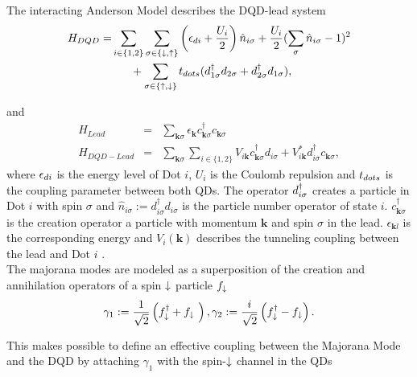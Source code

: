 \documentclass[showpacs,aps,prb,reprint,superscriptaddress]{revtex4-1}
\begin{document}
The interacting Anderson Model describes the DQD-lead system  
\begin{align}
\begin{split}
    H_{DQD}=&  \sum_{i\in\{1,2\}} \sum_{\sigma\in \{ \downarrow , \uparrow\}}  \left(\epsilon_{di}+\frac{U_i}{2}\right)\hat{n}_{i\sigma}+ \frac{U_i}{2}(\sum_{\sigma} \hat{n}_{i\sigma}-1)^{2} \\ 
&\ \ \ \ \ + \sum_{\sigma \in \{\uparrow , \downarrow\}} t_{dots}(d^{\dagger}_{1\sigma}  d_{2\sigma}+d^{\dagger}_{2\sigma}  d_{1\sigma}), \label{eq:H_DQD}
\end{split}
\end{align}

and 
\begin{eqnarray}
H_{Lead} & = & \sum_{\mathbf{k}\sigma }\epsilon_{\mathbf{k}}c_{\mathbf{k}\sigma }^{\dagger}c_{\mathbf{k}\sigma } \label{eq:H_L}\\ 
H_{DQD-Lead} & = &  \sum_{\mathbf{k}\sigma }\sum_{i\in\{1,2\}}V_{i\textbf{k}} c_{\mathbf{k}\sigma }^{\dagger}d_{i\sigma}+V^*_{i\textbf{k}} d_{i\sigma}^{\dagger}c_{\mathbf{k}\sigma }  \label{eq:H_DQDL},
\end{eqnarray}
%
where $\epsilon_{di}$ is the energy level of Dot $i$, $U_i$ is the Coulomb repulsion and $t_{dots}$ is the coupling parameter between both QDs. The operator $d^{\dagger}_{i\sigma}$ creates a particle in Dot $i$ with spin $\sigma$ and $\hat{n}_{i\sigma}:=d_{i\sigma}^{\dagger}d_{i\sigma}$ is the particle number operator of state $i$.  $c_{\mathbf{k}\sigma }^{\dagger}$ is the creation operator a particle with momentum $\mathbf{k}$ and spin
$\sigma$ in the lead.  $\epsilon_{\mathbf{k}l}$ is the corresponding energy
 and $V_i(\textbf{k})$ describes the tunneling coupling between the lead and Dot $i$ . \\


The majorana modes are modeled as a superposition of the creation and annihilation operators of a spin $\downarrow$ particle $f_\downarrow$
\begin{equation}
    \gamma_1 := \frac{1}{\sqrt{2}} \left( f^\dagger_{\downarrow} + f_{\downarrow}\ \right) , \gamma_2 := \frac{i}{\sqrt{2}} \left( f^\dagger_{\downarrow} - f_{\downarrow} \right). \label{eq:MajOp}
\end{equation}


This makes possible to define an effective coupling between the Majorana Mode and the DQD by attaching $\gamma_1$ with the spin-$\downarrow$ channel in the QDs
\end{document}
